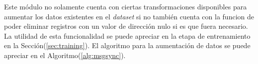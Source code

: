     \begin{table}[!h]
        \centering
        \caption[Transformaciones realizadas en la aumentación de datos.]{Transformaciones realizadas en la aumentación de datos. Fuente: Elaboración propia.}
    \label{tbl:transf}
    \end{table}

    Este módulo no solamente cuenta con ciertas transformaciones disponibles para aumentar los datos existentes en el \textit{dataset}
    si no también cuenta con la funcion de poder eliminar registros con un valor de dirección nulo si es que fuera necesario. La utilidad
    de esta funcionalidad se puede apreciar en la etapa de entrenamiento en la Sección(\ref{sec:training}). El algoritmo para 
    la aumentación de datos se puede apreciar en el Algoritmo(\ref{alg:msgsync}).

